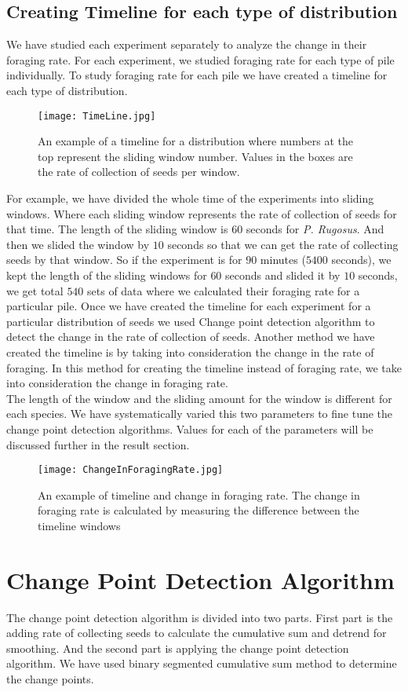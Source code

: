  \subsection{\label{Creating Timeline for each type of distribution}Creating Timeline for each type of distribution}
 We have studied each experiment separately to analyze the change in their foraging rate. For each experiment, we studied foraging rate for each type of pile individually. To study foraging rate for each pile we have created a timeline for each type of distribution. 
 \begin{figure}[h]
 	\texttt{[image: TimeLine.jpg]}
 	\caption{An example of a timeline for a distribution where numbers at the top represent the sliding window number. Values in the boxes are the rate of collection of seeds per window.}
 \end{figure}
 For example, we have divided the whole time of the experiments into sliding windows. Where each sliding window represents the rate of collection of seeds for that time. The length of the sliding window is $60$ seconds for \textit{P. Rugosus}. And then we slided the window by $10$ seconds so that we can get the rate of collecting seeds by that window. So if the experiment is for $90$ minutes ($5400$ seconds), we kept the length of the sliding windows for $60$ seconds and slided it by $10$ seconds, we get total $540$ sets of data where we calculated their foraging rate for a particular pile. Once we have created the timeline for each experiment for a particular distribution of seeds we used Change point detection algorithm to detect the change in the rate of collection of seeds. Another method we have created the timeline is by taking into consideration the change in the rate of foraging. In this method for creating the timeline instead of foraging rate, we take into consideration the change in foraging rate.\\ 
 The length of the window and the sliding amount for the window is different for each species. We have systematically varied this two parameters to fine tune the change point detection algorithms. Values for each of the parameters will be discussed further in the result section. 
 \begin{figure}[h]
 	\texttt{[image: ChangeInForagingRate.jpg]}
 	\caption{An example of timeline and change in foraging rate. The change in foraging rate is calculated by measuring the difference between the timeline windows}
 \end{figure}
\section{\label{section:Change Point Detection Algorithm}Change Point Detection Algorithm}
 The change point detection algorithm is divided into two parts. First part is the adding rate of collecting seeds to calculate the cumulative sum and detrend for smoothing. And the second part is applying the change point detection algorithm. We have used binary segmented cumulative sum method to determine the change points.
